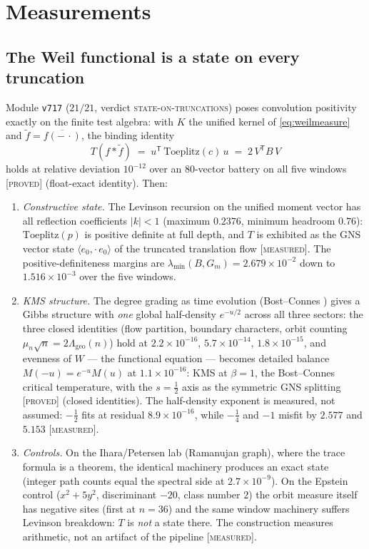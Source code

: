 \documentclass[11pt,a4paper]{article}
\theoremstyle{remark}
\newcommand{\PROVED}{\textnormal{[\textsc{proved}]}}
\newcommand{\MEASURED}{\textnormal{[\textsc{measured}]}}
\begin{document}
\section{Measurements}\label{sec:measure}

\subsection{The Weil functional is a state on every
truncation}\label{sec:state}

Module \texttt{v717} ($21/21$, verdict
\textsc{state-on-truncations}) poses convolution positivity exactly
on the finite test algebra: with $K$ the unified kernel of
\eqref{eq:weilmeasure} and $\tilde f=\overline{f(-\,\cdot)}$, the
binding identity
\[
T(f*\tilde f)\;=\;u^{\mathsf T}\,\mathrm{Toeplitz}(c)\,u
\;=\;2\,V^{\mathsf T}B\,V
\]
holds at relative deviation $10^{-12}$ over an $80$-vector battery
on all five windows \PROVED{} (float-exact identity).  Then:
\begin{enumerate}
\item[(i)] \emph{Constructive state.}  The Levinson recursion on the
unified moment vector has all reflection coefficients $|k|<1$
(maximum $0.2376$, minimum headroom $0.76$): $\mathrm{Toeplitz}(p)$
is positive definite at full depth, and $T$ is exhibited as the GNS
vector state $\langle e_0,\cdot\,e_0\rangle$ of the truncated
translation flow \MEASURED.  The positive-definiteness margins are
$\lambda_{\min}(B,G_m)=2.679\times10^{-2}$ down to
$1.516\times10^{-3}$ over the five windows.
\item[(ii)] \emph{KMS structure.}  The degree grading as time
evolution (Bost--Connes \cite{BC95}) gives a Gibbs structure with
\emph{one} global half-density $e^{-u/2}$ across all three sectors:
the three closed identities (flow partition, boundary characters,
orbit counting $\mu_n\sqrt n=2\Lambda_{\mathrm{geo}}(n)$) hold at
$2.2\times10^{-16}$, $5.7\times10^{-14}$, $1.8\times10^{-15}$, and
evenness of $W$ --- the functional equation --- becomes detailed
balance $M(-u)=e^{-u}M(u)$ at $1.1\times10^{-16}$: KMS at
$\beta=1$, the Bost--Connes critical temperature, with the
$s=\tfrac12$ axis as the symmetric GNS splitting \PROVED{} (closed
identities).  The half-density exponent is measured, not assumed:
$-\tfrac12$ fits at residual $8.9\times10^{-16}$, while $-\tfrac14$
and $-1$ misfit by $2.577$ and $5.153$ \MEASURED.
\item[(iii)] \emph{Controls.}  On the Ihara/Petersen lab (Ramanujan
graph), where the trace formula is a theorem, the identical machinery
produces an exact state (integer path counts equal the spectral side
at $2.7\times10^{-9}$).  On the Epstein control ($x^2+5y^2$,
discriminant $-20$, class number $2$) the orbit measure itself has
negative sites (first at $n=36$) and the same window machinery
suffers Levinson breakdown: $T$ is \emph{not} a state there.  The
construction measures arithmetic, not an artifact of the pipeline
\MEASURED.
\end{enumerate}
\end{document}
